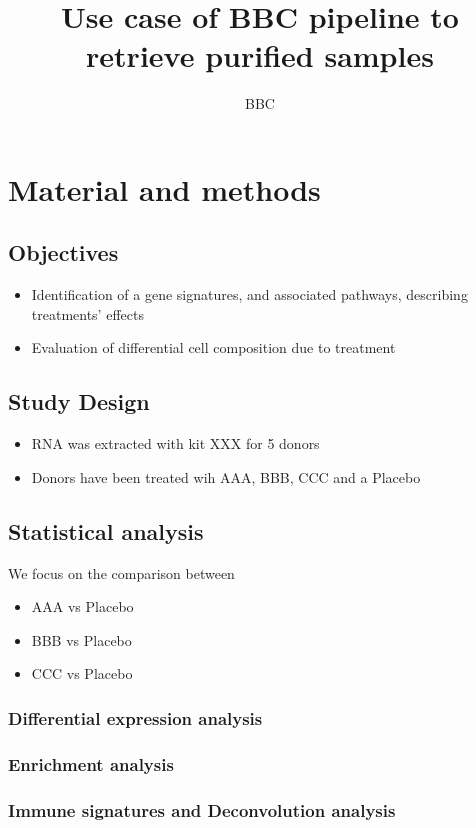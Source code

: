 \documentclass[
]{article}
\title{Use case of BBC pipeline to retrieve purified samples}
\author{BBC}
\date{}
\providecommand{\tightlist}{%
  \setlength{\itemsep}{0pt}\setlength{\parskip}{0pt}}
\begin{document}
\maketitle

\hypertarget{introduction}{%
\section{Material and methods}\label{introduction}}

\hypertarget{objectives}{%
\subsection{Objectives}\label{objectives}}

\begin{itemize}
\item
  Identification of a gene signatures, and associated pathways, describing treatments' effects
\item
  Evaluation of differential cell composition due to treatment
\end{itemize}

\hypertarget{study-design}{%
\subsection{Study Design}\label{study-design}}

\begin{itemize}
\item
  RNA was extracted with kit XXX for 5 donors
\item
  Donors have been treated wih AAA, BBB, CCC and a Placebo
\end{itemize}

\hypertarget{statistical-analysis}{%
\subsection{Statistical analysis}\label{statistical-analysis}}

We focus on the comparison between

\begin{itemize}
\tightlist
\item
  AAA vs Placebo
\item
  BBB vs Placebo
\item
  CCC vs Placebo
\end{itemize}

\hypertarget{differential-expression-analysis}{%
\subsubsection{Differential expression analysis}\label{differential-expression-analysis}}

\hypertarget{enrichment-analysis}{%
\subsubsection{Enrichment analysis}\label{enrichment-analysis}}

\hypertarget{immune-signatures-and-deconvolution-analysis}{%
\subsubsection{Immune signatures and Deconvolution analysis}\label{immune-signatures-and-deconvolution-analysis}}
\end{document}

